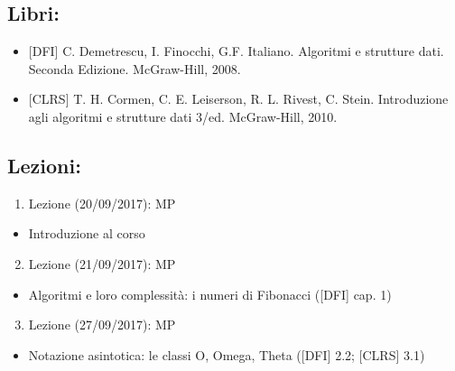 \documentclass{article}
\providecommand{\tightlist}{%
  \setlength{\itemsep}{0pt}\setlength{\parskip}{0pt}}
\begin{document}
\hypertarget{h.h56evxq8lcvu}{\subsection{\texorpdfstring{{Libri:}}{Libri:}}\label{h.h56evxq8lcvu}}

\begin{itemize}
\tightlist
\item
  {{[}DFI{]} C. Demetrescu, I. Finocchi, G.F. Italiano. Algoritmi e
  strutture dati. Seconda Edizione. McGraw-Hill, 2008.}
\item
  {{[}CLRS{]} T. H. Cormen, C. E. Leiserson, R. L. Rivest, C. Stein.
  Introduzione agli algoritmi e strutture dati 3/ed. McGraw-Hill, 2010.}
\end{itemize}

\hypertarget{h.56skrlxpqr7c}{\subsection{\texorpdfstring{{Lezioni:}}{Lezioni:}}\label{h.56skrlxpqr7c}}

{}

\begin{enumerate}
\tightlist
\item
  {Lezione (20/09/2017): MP}
\end{enumerate}

\begin{itemize}
\tightlist
\item
  {Introduzione al corso}
\end{itemize}

\begin{enumerate}
\setcounter{enumi}{1}
\tightlist
\item
  {Lezione (21/09/2017): MP}
\end{enumerate}

\begin{itemize}
\tightlist
\item
  {Algoritmi e loro complessità: i numeri di Fibonacci ({[}DFI{]} cap.
  1)}
\end{itemize}

\begin{enumerate}
\setcounter{enumi}{2}
\tightlist
\item
  {Lezione (27/09/2017): MP}
\end{enumerate}

\begin{itemize}
\tightlist
\item
  {Notazione asintotica: le classi O, Omega, Theta ({[}DFI{]} 2.2;
  {[}CLRS{]} 3.1)}
\end{itemize}
\end{document}
